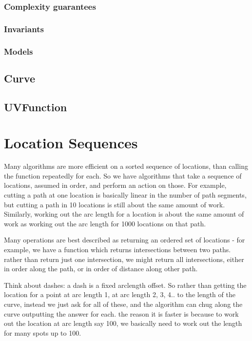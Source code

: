 \documentclass{book}
\begin{document}
\subsubsection{Complexity guarantees}

\subsubsection{Invariants}

\subsubsection{Models}

\subsection{Curve}

\subsection{UVFunction}

\section{Location Sequences}

Many algorithms are more efficient on a sorted sequence of locations,
than calling the function repeatedly for each.  So we have algorithms
that take a sequence of locations, assumed in order, and perform an
action on those.  For example, cutting a path at one location is
basically linear in the number of path segments, but cutting a path in
10 locations is still about the same amount of work.  Similarly,
working out the arc length for a location is about the same amount of
work as working out the arc length for 1000 locations on that path.

Many operations are best described as returning an ordered set of
locations - for example, we have a function which returns
intersections between two paths.  rather than return just one
intersection, we might return all intersections, either in order along
the path, or in order of distance along other path.

Think about dashes: a dash is a fixed arclength offset.  So rather
than getting the location for a point at arc length 1, at arc length
2, 3, 4.. to the length of the curve, instead we just ask for all of
these, and the algorithm can chug along the curve outputting the
answer for each.  the reason it is faster is because to work out the
location at arc length say 100, we basically need to work out the
length for many spots up to 100.
\end{document}
